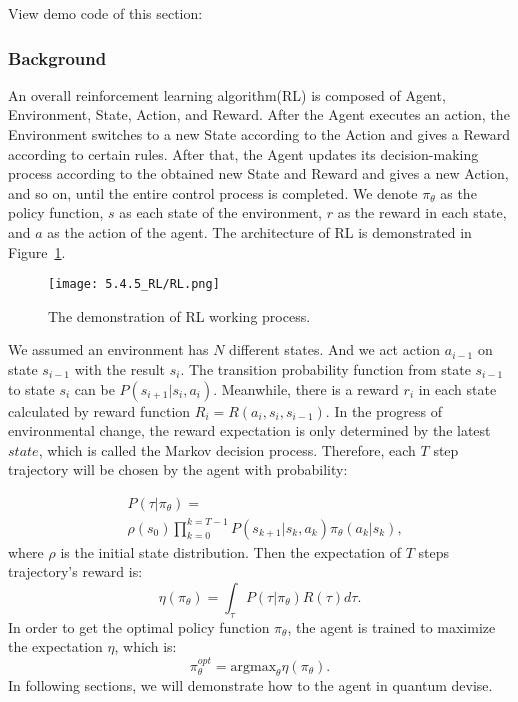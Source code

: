 View demo code of this section: 

\subsubsection{Background}

An overall reinforcement learning algorithm(RL) is composed of Agent, Environment, State, Action, and Reward. After the Agent executes an action, the Environment switches to a new State according to the Action and gives a Reward according to certain rules. After that, the Agent updates its decision-making process according to the obtained new State and Reward and gives a new Action, and so on, until the entire control process is completed. We denote $\pi_{\theta}$ as the policy function, $s$ as each state of the environment, $r$ as the reward in each state, and $a$ as the action of the agent. The architecture of RL is demonstrated in Figure~\ref{RL_frame}.
\begin{figure}[ht]
  \centering
  \texttt{[image: 5.4.5\_RL/RL.png]}
  \caption{\label{RL_frame} The demonstration of RL working process.}
\end{figure}

We assumed an environment has $N$ different states. And we act action $a_{i-1}$ on state $s_{i-1}$ with the result $s_{i}$. The transition probability function from state $s_{i-1}$ to state $s_{i}$ can be $P(s_{i+1}|s_{i},a_{i})$. Meanwhile, there is a reward $r_i$ in each state calculated by reward function $R_i=R(a_i,s_i,s_{i-1})$. In the progress of environmental change, the reward expectation is only determined by the latest $state$, which is called the Markov decision process. Therefore, each $T$ step trajectory will be chosen by the agent with probability:

\begin{equation}
    \begin{split}
        &P(\tau|\pi_{\theta})=\\
        &\rho(s_0)\prod_{k=0}^{k=T-1}P(s_{k+1}|s_{k},a_{k})\pi_{\theta}(a_{k}|s_{k}),
    \end{split}
\end{equation}
where $\rho$ is the initial state distribution. Then the expectation of $T$ steps trajectory's reward is:
\begin{equation}
    \eta(\pi_{\theta})=\int_{\tau}P(\tau|\pi_{\theta})R(\tau)d\tau.
\end{equation}
In order to get the optimal policy function $\pi_{\theta}$, the agent is trained to maximize the expectation $\eta$, which is:
\begin{equation}
    \pi_{\theta}^{opt}=\mathrm{argmax}_{\theta}\eta(\pi_{\theta}).
\end{equation}
In following sections, we will demonstrate how to the agent in quantum devise.

